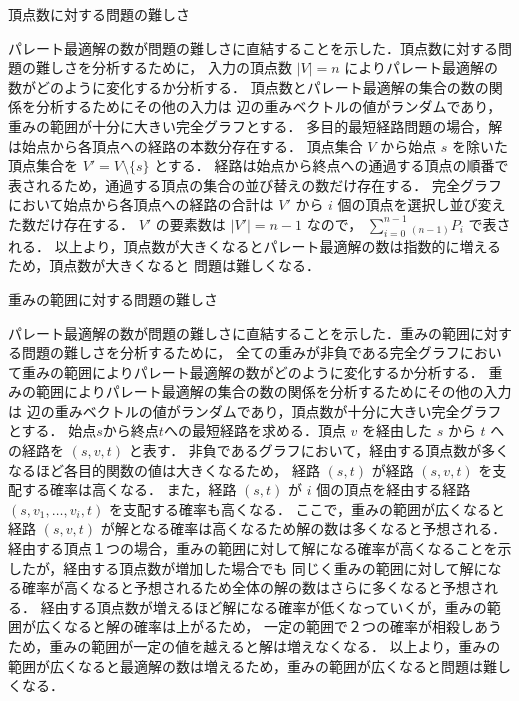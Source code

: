 \documentclass[12pt]{optlab-bachelor}
\begin{document}
\begin{description}
  \item[頂点数に対する問題の難しさ]
\end{description}

パレート最適解の数が問題の難しさに直結することを示した．頂点数に対する問題の難しさを分析するために，
入力の頂点数 $|V|=n$ によりパレート最適解の数がどのように変化するか分析する．
頂点数とパレート最適解の集合の数の関係を分析するためにその他の入力は
辺の重みベクトルの値がランダムであり，重みの範囲が十分に大きい完全グラフとする．
多目的最短経路問題の場合，解は始点から各頂点への経路の本数分存在する．
頂点集合 $V$ から始点 $s$ を除いた頂点集合を $V'=V \setminus \{s\}$ とする．
経路は始点から終点への通過する頂点の順番で表されるため，通過する頂点の集合の並び替えの数だけ存在する．
完全グラフにおいて始点から各頂点への経路の合計は $V'$ から $i$ 個の頂点を選択し並び変えた数だけ存在する．
$V'$ の要素数は $|V'|=n-1$ なので， $\displaystyle \sum_{i=0}^{n-1} {}_{(n-1)}P_i$ で表される．
以上より，頂点数が大きくなるとパレート最適解の数は指数的に増えるため，頂点数が大きくなると
問題は難しくなる．

\begin{description}
  \item[重みの範囲に対する問題の難しさ]
\end{description}

パレート最適解の数が問題の難しさに直結することを示した．重みの範囲に対する問題の難しさを分析するために，
全ての重みが非負である完全グラフにおいて重みの範囲によりパレート最適解の数がどのように変化するか分析する．
重みの範囲によりパレート最適解の集合の数の関係を分析するためにその他の入力は
辺の重みベクトルの値がランダムであり，頂点数が十分に大きい完全グラフとする．
始点$s$から終点$t$への最短経路を求める．頂点 $v$ を経由した $s$ から $t$ への経路を $(s,v,t)$ と表す．
非負であるグラフにおいて，経由する頂点数が多くなるほど各目的関数の値は大きくなるため，
経路 $(s,t)$ が経路 $(s,v,t)$ を支配する確率は高くなる．
また，経路 $(s,t)$ が $i$ 個の頂点を経由する経路 $(s,v_1,\ldots,v_i,t)$ を支配する確率も高くなる．
ここで，重みの範囲が広くなると経路 $(s,v,t)$ が解となる確率は高くなるため解の数は多くなると予想される．
経由する頂点１つの場合，重みの範囲に対して解になる確率が高くなることを示したが，経由する頂点数が増加した場合でも
同じく重みの範囲に対して解になる確率が高くなると予想されるため全体の解の数はさらに多くなると予想される．
経由する頂点数が増えるほど解になる確率が低くなっていくが，重みの範囲が広くなると解の確率は上がるため，
一定の範囲で２つの確率が相殺しあうため，重みの範囲が一定の値を越えると解は増えなくなる．
以上より，重みの範囲が広くなると最適解の数は増えるため，重みの範囲が広くなると問題は難しくなる．
\end{document}
